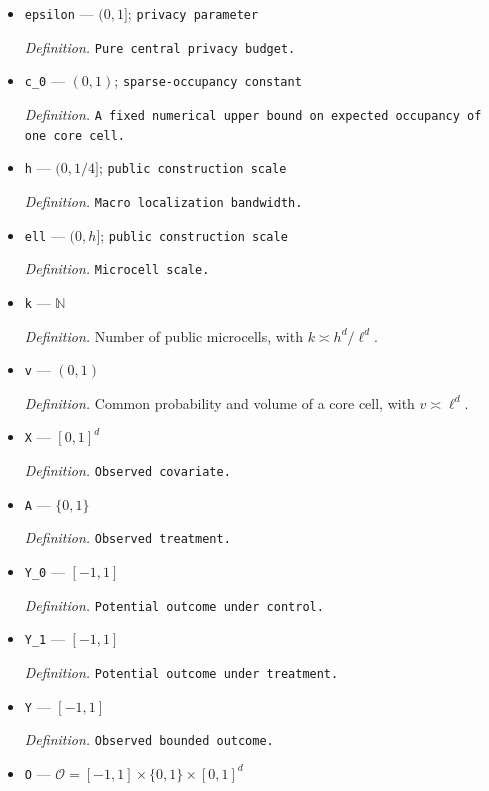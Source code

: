 \documentclass{article}
\begin{document}
\begin{itemize}
  \par\smallskip\noindent\emph{Definition.} \texttt{Sample size.}
  \item \texttt{epsilon} --- \((0,1]\); \texttt{privacy parameter}
  \par\smallskip\noindent\emph{Definition.} \texttt{Pure central privacy budget.}
  \item \texttt{c\_\allowbreak{}0} --- \((0,1)\); \texttt{sparse-\allowbreak{}occupancy constant}
  \par\smallskip\noindent\emph{Definition.} \texttt{A fixed numerical upper bound on expected occupancy of one core cell.}
  \item \texttt{h} --- \((0,1/4]\); \texttt{public construction scale}
  \par\smallskip\noindent\emph{Definition.} \texttt{Macro localization bandwidth.}
  \item \texttt{ell} --- \((0,h]\); \texttt{public construction scale}
  \par\smallskip\noindent\emph{Definition.} \texttt{Microcell scale.}
  \item \texttt{k} --- \(\mathbb N\)
  \par\smallskip\noindent\emph{Definition.} Number of public microcells, with \(k\asymp h^d/\ell^d\).
  \item \texttt{v} --- \((0,1)\)
  \par\smallskip\noindent\emph{Definition.} Common probability and volume of a core cell, with \(v\asymp\ell^d\).
  \item \texttt{X} --- \([0,1]^d\)
  \par\smallskip\noindent\emph{Definition.} \texttt{Observed covariate.}
  \item \texttt{A} --- \(\{0,1\}\)
  \par\smallskip\noindent\emph{Definition.} \texttt{Observed treatment.}
  \item \texttt{Y\_\allowbreak{}0} --- \([-1,1]\)
  \par\smallskip\noindent\emph{Definition.} \texttt{Potential outcome under control.}
  \item \texttt{Y\_\allowbreak{}1} --- \([-1,1]\)
  \par\smallskip\noindent\emph{Definition.} \texttt{Potential outcome under treatment.}
  \item \texttt{Y} --- \([-1,1]\)
  \par\smallskip\noindent\emph{Definition.} \texttt{Observed bounded outcome.}
  \item \texttt{O} --- \(\mathcal O=[-1,1]\times\{0,1\}\times[0,1]^d\)

\end{itemize}
\end{document}
